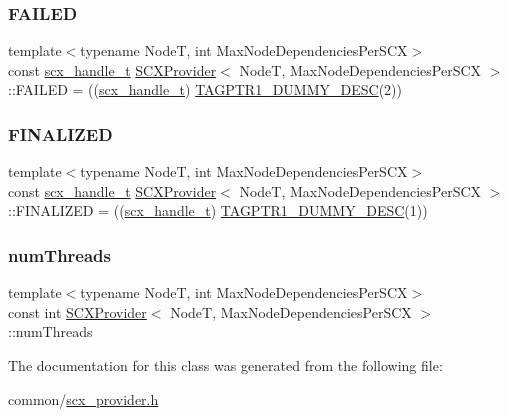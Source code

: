 \subsubsection{\texorpdfstring{F\+A\+I\+L\+ED}{FAILED}}
{\footnotesize\ttfamily template$<$typename NodeT, int Max\+Node\+Dependencies\+Per\+S\+CX$>$ \\
const \hyperlink{scx__provider_8h_a368fa55a4b553010913289d3cbe6ce22}{scx\+\_\+handle\+\_\+t} \hyperlink{classSCXProvider}{S\+C\+X\+Provider}$<$ NodeT, Max\+Node\+Dependencies\+Per\+S\+CX $>$\+::F\+A\+I\+L\+ED = ((\hyperlink{scx__provider_8h_a368fa55a4b553010913289d3cbe6ce22}{scx\+\_\+handle\+\_\+t}) \hyperlink{descriptors__impl_8h_a2266c3e52da603438177ca5100c721a1}{T\+A\+G\+P\+T\+R1\+\_\+\+D\+U\+M\+M\+Y\+\_\+\+D\+E\+SC}(2))\hspace{0.3cm}{\ttfamily [static]}}

\mbox{\label{classSCXProvider_a324568fae39abebab2a9c83e628fa7ad}} 
\subsubsection{\texorpdfstring{F\+I\+N\+A\+L\+I\+Z\+ED}{FINALIZED}}
{\footnotesize\ttfamily template$<$typename NodeT, int Max\+Node\+Dependencies\+Per\+S\+CX$>$ \\
const \hyperlink{scx__provider_8h_a368fa55a4b553010913289d3cbe6ce22}{scx\+\_\+handle\+\_\+t} \hyperlink{classSCXProvider}{S\+C\+X\+Provider}$<$ NodeT, Max\+Node\+Dependencies\+Per\+S\+CX $>$\+::F\+I\+N\+A\+L\+I\+Z\+ED = ((\hyperlink{scx__provider_8h_a368fa55a4b553010913289d3cbe6ce22}{scx\+\_\+handle\+\_\+t}) \hyperlink{descriptors__impl_8h_a2266c3e52da603438177ca5100c721a1}{T\+A\+G\+P\+T\+R1\+\_\+\+D\+U\+M\+M\+Y\+\_\+\+D\+E\+SC}(1))\hspace{0.3cm}{\ttfamily [static]}}

\mbox{\label{classSCXProvider_a69d5eba7f068aaa3c10898524d3e3757}} 
\subsubsection{\texorpdfstring{num\+Threads}{numThreads}}
{\footnotesize\ttfamily template$<$typename NodeT, int Max\+Node\+Dependencies\+Per\+S\+CX$>$ \\
const int \hyperlink{classSCXProvider}{S\+C\+X\+Provider}$<$ NodeT, Max\+Node\+Dependencies\+Per\+S\+CX $>$\+::num\+Threads}



The documentation for this class was generated from the following file\+:\begin{DoxyCompactItemize}
\item 
common/\hyperlink{scx__provider_8h}{scx\+\_\+provider.\+h}\end{DoxyCompactItemize}
